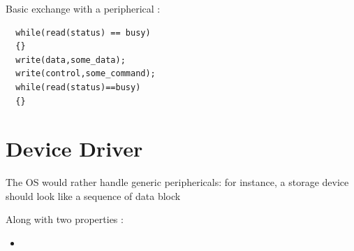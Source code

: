 \documentclass[a4paper,10pt]{article}
\begin{document}
Basic exchange with a peripherical :

\begin{verbatim}
  while(read(status) == busy) 
  {}
  write(data,some_data);
  write(control,some_command);
  while(read(status)==busy) 
  {}
\end{verbatim}



\section{Device Driver}

The OS would rather handle generic periphericals: for instance, a storage device should look like a sequence of data block


Along with two properties :
\begin{itemize}
  \item 
\end{itemize}
\end{document}
